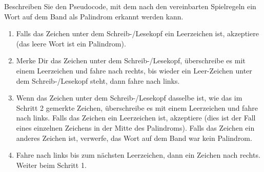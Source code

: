 Beschreiben Sie den Pseudocode, mit dem nach den vereinbarten
Spielregeln ein Wort auf dem Band als Palindrom erkannt werden kann.


\begin{loesung}
\begin{enumerate}
\item
Falls das Zeichen unter dem Schreib-/Lesekopf ein Leerzeichen ist,
akzeptiere (das leere Wort ist ein Palindrom).
\item
Merke Dir das Zeichen unter dem Schreib-/Lesekopf, überschreibe es mit
einem Leerzeichen und fahre nach rechts, bis wieder ein Leer-Zeichen
unter dem Schreib-/Lesekopf steht, dann fahre nach links.
\item
Wenn das Zeichen unter dem Schreib-/Lesekopf dasselbe ist, wie das
im Schritt 2 gemerkte Zeichen, überschreibe es mit einem Leerzeichen
und fahre nach links.
Falls das Zeichen ein Leerzeichen ist, akzeptiere (dies ist der Fall
eines einzelnen Zeichens in der Mitte des Palindroms).
Falls das Zeichen ein anderes Zeichen ist, verwerfe, das Wort auf 
dem Band war kein Palindrom.
\item
Fahre nach links bis zum nächsten Leerzeichen, dann ein Zeichen nach rechts.
Weiter beim Schritt 1.
\qedhere
\end{enumerate}
\end{loesung}




